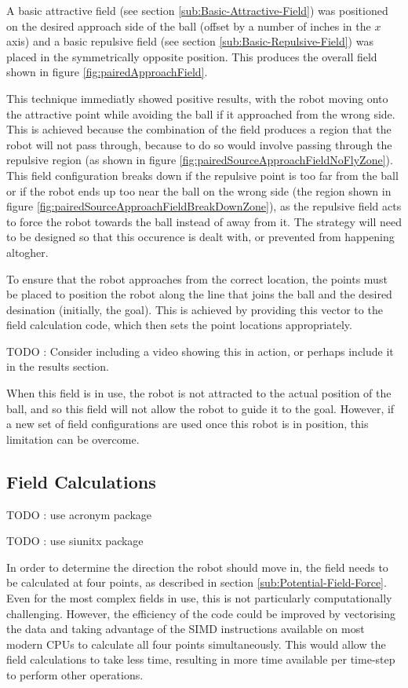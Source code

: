 \documentclass[10pt]{article}
\begin{document}
A basic attractive field (see section \ref{sub:Basic-Attractive-Field}) was positioned on the desired approach side of the ball (offset by a number of inches in the $x$ axis) and a basic repulsive field (see section \ref{sub:Basic-Repulsive-Field}) was placed in the symmetrically opposite position. This produces the overall field shown in figure \ref{fig:pairedApproachField}.

This technique immediatly showed positive results, with the robot moving onto the attractive point while avoiding the ball if it approached from the wrong side. This is achieved because the combination of the field produces a region that the robot will not pass through, because to do so would involve passing through the repulsive region (as shown in figure \ref{fig:pairedSourceApproachFieldNoFlyZone}).  This field configuration breaks down if the repulsive point is too far from the ball or if the robot ends up too near the ball on the wrong side (the region shown in figure \ref{fig:pairedSourceApproachFieldBreakDownZone}), as the repulsive field acts to force the robot towards the ball instead of away from it.  The strategy will need to be designed so that this occurence is dealt with, or prevented from happening altogher.

To ensure that the robot approaches from the correct location, the points must be placed to position the robot along the line that joins the ball and the desired desination (initially, the goal).  This is achieved by providing this vector to the field calculation code, which then sets the point locations appropriately.

TODO : Consider including a video showing this in action, or perhaps include it in the results section.

When this field is in use, the robot is not attracted to the actual position of the ball, and so this field will not allow the robot to guide it to the goal. However, if a new set of field configurations are used once this robot is in position, this limitation can be overcome.

\subsection{Field Calculations}

TODO : use acronym package

TODO : use siunitx package

In order to determine the direction the robot should move in, the field needs to be calculated at four points, as described in section \ref{sub:Potential-Field-Force}. Even for the most complex fields in use, this is not particularly computationally challenging. However, the efficiency of the code could be improved by vectorising the data and taking advantage of the \ac{SIMD} instructions available on most modern \acp{CPU} to calculate all four points simultaneously. This would allow the field calculations to take less time, resulting in more time available per time-step to perform other operations.
\end{document}
